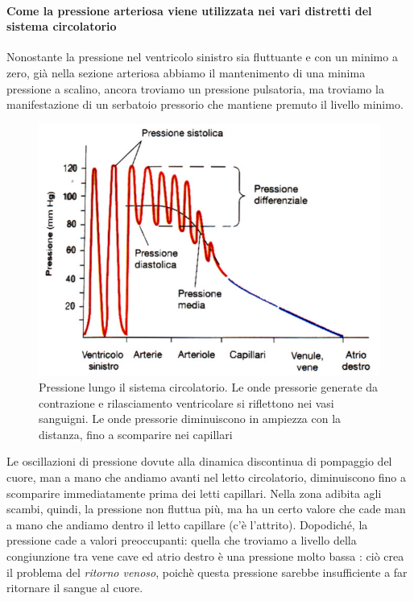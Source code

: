 \documentclass[a4paper,12pt]{article}
\begin{document}
\paragraph{Come la pressione arteriosa viene utilizzata nei vari distretti del sistema circolatorio} Nonostante la pressione nel ventricolo sinistro sia fluttuante e con un minimo a zero, già nella sezione arteriosa abbiamo il mantenimento di una minima pressione a scalino, ancora troviamo un pressione pulsatoria, ma troviamo  la manifestazione di un serbatoio pressorio che mantiene premuto il livello minimo. 
\begin{figure}[H]
\centering
\includegraphics[scale=0.45]{immagine/press.jpg}
\caption{Pressione lungo il sistema circolatorio. Le onde pressorie generate da contrazione e rilasciamento ventricolare si riflettono nei vasi sanguigni. Le onde pressorie diminuiscono in ampiezza con la distanza, fino a scomparire nei capillari}
\end{figure}
Le oscillazioni di pressione dovute alla dinamica discontinua di pompaggio del cuore, man a mano che andiamo avanti nel letto circolatorio, diminuiscono fino a scomparire immediatamente prima dei letti capillari. Nella zona adibita agli scambi, quindi, la pressione non fluttua più, ma ha un certo valore che cade man a mano che andiamo dentro il letto capillare (c'è l'attrito). Dopodiché, la pressione cade a valori preoccupanti: quella che troviamo a livello della congiunzione tra vene cave ed atrio destro è una pressione molto bassa : ciò crea il problema del \emph{ritorno venoso}, poichè questa pressione sarebbe insufficiente a far ritornare il sangue al cuore.
\end{document}
